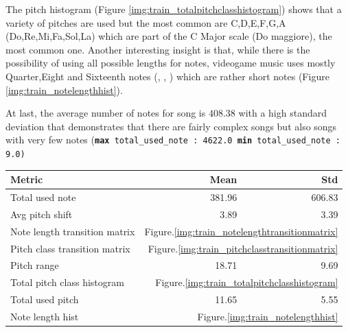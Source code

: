 \documentclass[10pt,twocolumn,letterpaper]{article}
\begin{document}
The pitch histogram (Figure \ref{img:train_totalpitchclasshistogram}) shows that a variety of pitches are used but the most common are C,D,E,F,G,A (Do,Re,Mi,Fa,Sol,La) which are part of the C Major scale (Do maggiore), the most common one.
Another interesting insight is that, while there is the possibility of using all possible lengths for notes, videogame music uses mostly Quarter,Eight and Sixteenth notes (\Vier, \Acht, \Sech) which are rather short notes (Figure \ref{img:train_notelengthhist}).



At last, the average number of notes for song is $408.38$ with a high standard deviation that demonstrates that there are fairly complex songs but also songs with very few notes
{(\tt{\textbf{max} total\_used\_note} : 4622.0 \tt{\textbf{min} total\_used\_note} : 9.0)}

\begin{center}
 \begin{tabular}{l r r} 
 \hline
 \textbf{Metric} & \textbf{Mean} & \textbf{Std}   \\ [0.5ex] 
 \hline\hline
 Total used note & 381.96 & 606.83 \\
 \hline
Avg pitch shift & 3.89 & 3.39 \\
 \hline
Note length transition matrix & \multicolumn{2}{r}{Figure.\ref{img:train_notelengthtransitionmatrix} } \\
 \hline
Pitch class transition matrix & \multicolumn{2}{r}{Figure.\ref{img:train_pitchclasstransitionmatrix}} \\
 \hline
Pitch range & 18.71 & 9.69 \\
 \hline
Total pitch class histogram & \multicolumn{2}{r}{Figure.\ref{img:train_totalpitchclasshistogram}}\\
 \hline
Total used pitch & 11.65 & 5.55 \\
 \hline
Note length hist & \multicolumn{2}{r}{Figure.\ref{img:train_notelengthhist}} \\[1ex]
 \hline
\end{tabular}
\end{center}
\end{document}
